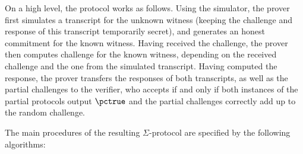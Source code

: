 \documentclass[11pt]{article}
\begin{document}
	On a high level, the protocol works as follows.
	Using the simulator, the prover first simulates a transcript for the unknown witness (keeping the challenge and response of this transcript temporarily secret), and generates an honest commitment for the known witness.
	Having received the challenge, the prover then computes challenge for the known witness, depending on the received challenge and the one from the simulated transcript.
	Having computed the response, the prover transfers the responses of both transcripts, as well as the partial challenges to the verifier, who accepts if and only if both instances of the partial protocols output $\accept$ and the partial challenges correctly add up to the random challenge.

The main procedures of the resulting $\Sigma$-protocol are specified by the following algorithms:
\end{document}
